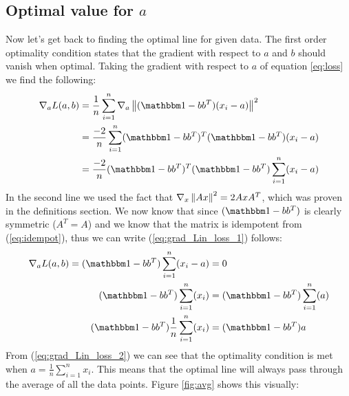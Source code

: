 \subsection{Optimal value for $a$}
Now let's get back to finding the optimal line for given data. 
The first order optimality condition states that the gradient
with respect to $a$ and $b$ should vanish when optimal.
Taking the gradient with respect to $a$ 
of equation \ref{eq:loss} we find the following:
\begin{equation}
\label{eq:grad_Lin_loss_1}
\begin{split}
\nabla_a L(a,b) &=  \frac{1}{n}\sum_{i=1}^{n}
	\nabla_a\norm{(\ID - bb^T)(x_i - a)}^2 \\
&= \frac{-2}{n}\sum_{i=1}^{n}
	(\ID - bb^T)^T(\ID - bb^T)(x_i - a) \\
&= \frac{-2}{n}(\ID - bb^T)^T
	(\ID - bb^T)\sum_{i=1}^{n}(x_i - a) \\
\end{split}
\end{equation}
In the second line we used the fact that $\nabla_x \left\lVert Ax\right\rVert^2 = 2AxA^T$,
which was proven in the definitions section.
We now know that since $(\ID - bb^T)$ is clearly symmetric 
($A^T = A$) and we know that the matrix is idempotent from 
(\ref{eq:idempot}), thus we can write 
(\ref{eq:grad_Lin_loss_1}) follows:
\begin{equation}
\label{eq:grad_Lin_loss_2}
\begin{split}					
	\nabla_a L(a,b) = (\ID - bb^T)\sum_{i=1}^{n}(x_i - a) &= 0\\
	(\ID - bb^T)\sum_{i=1}^{n}(x_i) &= (\ID - bb^T)\sum_{i=1}^{n}(a)\\
	(\ID - bb^T)\frac{1}{n}\sum_{i=1}^{n}(x_i) &= (\ID - bb^T)a\\
\end{split}
\end{equation}
From (\ref{eq:grad_Lin_loss_2}) we can see that the 
optimality condition is met when $a = \frac{1}{n}\sum_{i=1}^{n}x_i$.
This means that the optimal line will always pass through 
the average of all the data points. Figure \ref{fig:avg} 
shows this visually:\\

